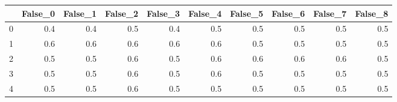 \begin{tabular}{lrrrrrrrrr}
\toprule
{} &  False\_0 &  False\_1 &  False\_2 &  False\_3 &  False\_4 &  False\_5 &  False\_6 &  False\_7 &  False\_8 \\ \hline
\midrule
0 &      0.4 &      0.4 &      0.5 &      0.4 &      0.5 &      0.5 &      0.5 &      0.5 &      0.5 \\ \hline
1 &      0.6 &      0.6 &      0.6 &      0.6 &      0.6 &      0.5 &      0.5 &      0.5 &      0.5 \\ \hline
2 &      0.5 &      0.5 &      0.6 &      0.5 &      0.6 &      0.6 &      0.6 &      0.6 &      0.5 \\ \hline
3 &      0.5 &      0.5 &      0.6 &      0.5 &      0.6 &      0.5 &      0.5 &      0.5 &      0.5 \\ \hline
4 &      0.5 &      0.5 &      0.6 &      0.5 &      0.5 &      0.5 &      0.5 &      0.5 &      0.5 \\ \hline
\bottomrule
\end{tabular}
